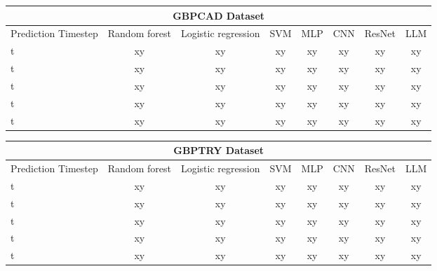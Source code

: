 \begin{center}
	\begin{tabular}{||l || c | c | c | c | c | c | c||}
		\hline
		\multicolumn{8}{|c|}{GBPCAD Dataset}                                                       \\
		\hline
		Prediction Timestep & Random forest & Logistic regression & SVM & MLP & CNN & ResNet & LLM \\ [0.5ex]
		\hline\hline
		t                   & xy            & xy                  & xy  & xy  & xy  & xy     & xy  \\
		\hline
		t                   & xy            & xy                  & xy  & xy  & xy  & xy     & xy  \\
		\hline
		t                   & xy            & xy                  & xy  & xy  & xy  & xy     & xy  \\
		\hline
		t                   & xy            & xy                  & xy  & xy  & xy  & xy     & xy  \\
		\hline
		t                   & xy            & xy                  & xy  & xy  & xy  & xy     & xy  \\[1ex]
		\hline
	\end{tabular}
\end{center}
\begin{center}
	\begin{tabular}{||l || c | c | c | c | c | c | c||}
		\hline
		\multicolumn{8}{|c|}{GBPTRY Dataset}                                                       \\
		\hline
		Prediction Timestep & Random forest & Logistic regression & SVM & MLP & CNN & ResNet & LLM \\ [0.5ex]
		\hline\hline
		t                   & xy            & xy                  & xy  & xy  & xy  & xy     & xy  \\
		\hline
		t                   & xy            & xy                  & xy  & xy  & xy  & xy     & xy  \\
		\hline
		t                   & xy            & xy                  & xy  & xy  & xy  & xy     & xy  \\
		\hline
		t                   & xy            & xy                  & xy  & xy  & xy  & xy     & xy  \\
		\hline
		t                   & xy            & xy                  & xy  & xy  & xy  & xy     & xy  \\[1ex]
		\hline
	\end{tabular}
\end{center}
